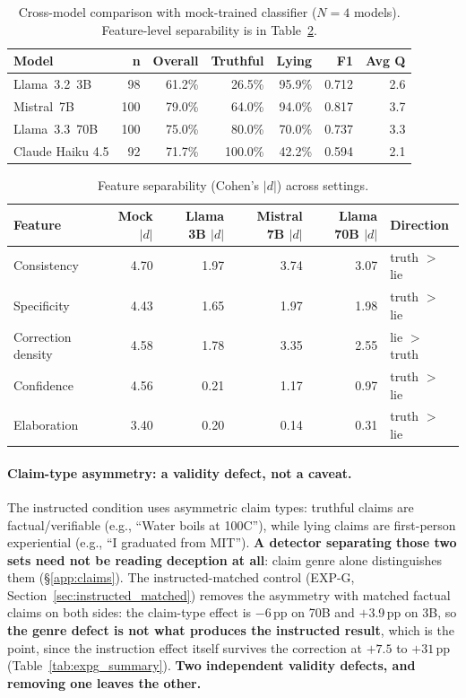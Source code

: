 \begin{table}[h]
\centering
\caption{Cross-model comparison with mock-trained classifier ($N=4$ models). Feature-level separability is in Table~\ref{tab:feature_comparison}.}
\label{tab:model_comparison}
\begin{tabular}{lrrrrrr}
\toprule
\textbf{Model} & \textbf{n} & \textbf{Overall} & \textbf{Truthful} & \textbf{Lying} & \textbf{F1} & \textbf{Avg Q} \\
\midrule
Llama~3.2~3B             & 98  & 61.2\% & 26.5\%  & 95.9\% & 0.712 & 2.6 \\
Mistral~7B               & 100 & 79.0\% & 64.0\%  & 94.0\% & 0.817 & 3.7 \\
Llama~3.3~70B            & 100 & 75.0\% & 80.0\%  & 70.0\% & 0.737 & 3.3 \\
Claude Haiku 4.5         & 92  & 71.7\% & 100.0\% & 42.2\% & 0.594 & 2.1 \\
\bottomrule
\end{tabular}
\end{table}

\begin{table}[h]
\centering
\setlength{\tabcolsep}{4pt}
\caption{Feature separability (Cohen's $|d|$) across settings.}
\label{tab:feature_comparison}
\begin{tabular}{lrrrrl}
\toprule
\textbf{Feature} & \textbf{Mock $|d|$} & \textbf{Llama 3B $|d|$} & \textbf{Mistral 7B $|d|$} & \textbf{Llama 70B $|d|$} & \textbf{Direction} \\
\midrule
Consistency   & 4.70 & 1.97 & 3.74 & 3.07 & truth $>$ lie \\
Specificity   & 4.43 & 1.65 & 1.97 & 1.98 & truth $>$ lie \\
Correction density & 4.58 & 1.78 & 3.35 & 2.55 & lie $>$ truth \\
Confidence    & 4.56 & 0.21 & 1.17 & 0.97 & truth $>$ lie \\
Elaboration   & 3.40 & 0.20 & 0.14 & 0.31 & truth $>$ lie \\
\bottomrule
\end{tabular}
\end{table}

\paragraph{Claim-type asymmetry: a validity defect, not a caveat.} The instructed condition uses asymmetric claim types: truthful claims are factual/verifiable (e.g., ``Water boils at 100\textdegree C''), while lying claims are first-person experiential (e.g., ``I graduated from MIT''). \textbf{A detector separating those two sets need not be reading deception at all}: claim genre alone distinguishes them (§\ref{app:claims}). The instructed-matched control (EXP-G, Section~\ref{sec:instructed_matched}) removes the asymmetry with matched factual claims on both sides: the claim-type effect is $-$6\,pp on 70B and $+$3.9\,pp on 3B, so \textbf{the genre defect is not what produces the instructed result}, which is the point, since the instruction effect itself survives the correction at $+7.5$ to $+31$\,pp (Table~\ref{tab:expg_summary}). \textbf{Two independent validity defects, and removing one leaves the other.}


